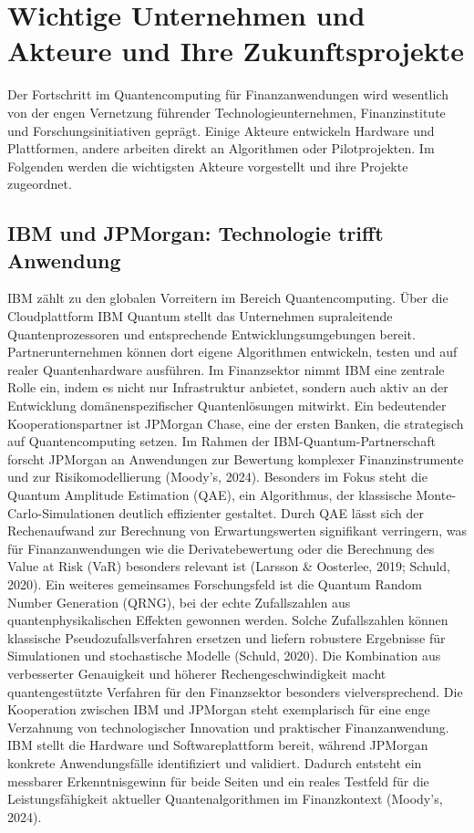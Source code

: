 \section{Wichtige Unternehmen und Akteure und Ihre Zukunftsprojekte}
Der Fortschritt im Quantencomputing für Finanzanwendungen wird wesentlich von der engen Vernetzung führender Technologieunternehmen, Finanzinstitute und Forschungsinitiativen geprägt. Einige Akteure entwickeln Hardware und Plattformen, andere arbeiten direkt an Algorithmen oder Pilotprojekten. Im Folgenden werden die wichtigsten Akteure vorgestellt und ihre Projekte zugeordnet.

\subsection{IBM und JPMorgan: Technologie trifft Anwendung}

IBM zählt zu den globalen Vorreitern im Bereich Quantencomputing. Über die Cloudplattform IBM Quantum stellt das Unternehmen supraleitende Quantenprozessoren und entsprechende Entwicklungsumgebungen bereit. Partnerunternehmen können dort eigene Algorithmen entwickeln, testen und auf realer Quantenhardware ausführen. Im Finanzsektor nimmt IBM eine zentrale Rolle ein, indem es nicht nur Infrastruktur anbietet, sondern auch aktiv an der Entwicklung domänenspezifischer Quantenlösungen mitwirkt.
Ein bedeutender Kooperationspartner ist JPMorgan Chase, eine der ersten Banken, die strategisch auf Quantencomputing setzen. Im Rahmen der IBM-Quantum-Partnerschaft forscht JPMorgan an Anwendungen zur Bewertung komplexer Finanzinstrumente und zur Risikomodellierung (Moody’s, 2024). Besonders im Fokus steht die Quantum Amplitude Estimation (QAE), ein Algorithmus, der klassische Monte-Carlo-Simulationen deutlich effizienter gestaltet. Durch QAE lässt sich der Rechenaufwand zur Berechnung von Erwartungswerten signifikant verringern, was für Finanzanwendungen wie die Derivatebewertung oder die Berechnung des Value at Risk (VaR) besonders relevant ist (Larsson & Oosterlee, 2019; Schuld, 2020).
Ein weiteres gemeinsames Forschungsfeld ist die Quantum Random Number Generation (QRNG), bei der echte Zufallszahlen aus quantenphysikalischen Effekten gewonnen werden. Solche Zufallszahlen können klassische Pseudozufallsverfahren ersetzen und liefern robustere Ergebnisse für Simulationen und stochastische Modelle (Schuld, 2020). Die Kombination aus verbesserter Genauigkeit und höherer Rechengeschwindigkeit macht quantengestützte Verfahren für den Finanzsektor besonders vielversprechend.
Die Kooperation zwischen IBM und JPMorgan steht exemplarisch für eine enge Verzahnung von technologischer Innovation und praktischer Finanzanwendung. IBM stellt die Hardware und Softwareplattform bereit, während JPMorgan konkrete Anwendungsfälle identifiziert und validiert. Dadurch entsteht ein messbarer Erkenntnisgewinn für beide Seiten und ein reales Testfeld für die Leistungsfähigkeit aktueller Quantenalgorithmen im Finanzkontext (Moody’s, 2024).

